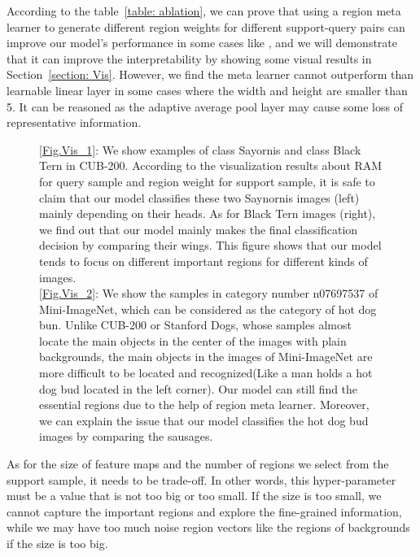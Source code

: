 \documentclass[letterpaper]{article}
\begin{document}
According to the table~\ref{table: ablation}, we can prove that using a region meta learner to generate different region weights for different support-query pairs can improve our model's performance in some cases like , and we will demonstrate that it can improve the interpretability by showing some visual results in Section~\ref{section: Vis}. However, we find the meta learner cannot outperform than learnable linear layer in some cases where the width and height are smaller than 5. It can be reasoned as the adaptive average pool layer may cause some loss of representative information. 

\begin{figure}
\centering 
{}
\caption{\ref{Fig.Vis_1}: 
We show examples of class Sayornis and class Black Tern in CUB-200. According to the visualization results about RAM for query sample and region weight for support sample, it is safe to claim that our model classifies these two Saynornis images (left) mainly depending on their heads. As for Black Tern images (right), we find out that our model mainly makes the final classification decision by comparing their wings. This figure shows that our model tends to focus on different important regions for different kinds of images.\\        
\ref{Fig.Vis_2}: 
We show the samples in category number n07697537 of Mini-ImageNet, which can be considered as the category of hot dog bun. Unlike CUB-200 or Stanford Dogs, whose samples almost locate the main objects in the center of the images with plain backgrounds, the main objects in the images of Mini-ImageNet are more difficult to be located and recognized(Like a man holds a hot dog bud located in the left corner). Our model can still find the essential regions due to the help of region meta learner. Moreover, we can explain the issue that our model classifies the hot dog bud images by comparing the sausages.}
\label{fig:visualization}
\end{figure}

As for the size of feature maps and the number of regions we select from the support sample, it needs to be trade-off. In other words, this hyper-parameter must be a value that is not too big or too small. If the size is too small, we cannot capture the important regions and explore the fine-grained information, while we may have too much noise region vectors like the regions of backgrounds if the size is too big.  
\end{document}
